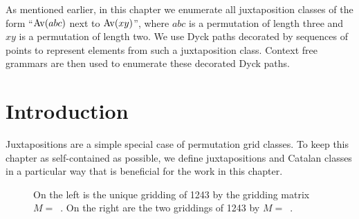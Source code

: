 As mentioned earlier, in this chapter we enumerate all juxtaposition classes of the form ``$\mathrm{Av}(abc)$ next to $\mathrm{Av}(xy)$'', where $abc$ is a permutation of length three and $xy$ is a permutation of length two. We use Dyck paths decorated by sequences of points to represent elements from such a juxtaposition class. Context free grammars are then used to enumerate these decorated Dyck paths.


\newsavebox{\smlmata}
\newsavebox{\smlmatb}

\section{Introduction}

Juxtapositions are a simple special case of permutation grid classes. To keep this chapter as self-contained as possible, we define juxtapositions and Catalan classes in a particular way that is beneficial for the work in this chapter. 

\begin{figure}[!ht]
\begin{center}
\captionsetup{singlelinecheck=off}
\caption{\small On the left is the unique gridding of 1243 by the gridding matrix $M =$~\usebox{\smlmata}. On the right are the two griddings of 1243 by $M =$~\usebox{\smlmatb}.}
\label{fig:gridexample}
\end{center}
\end{figure}


